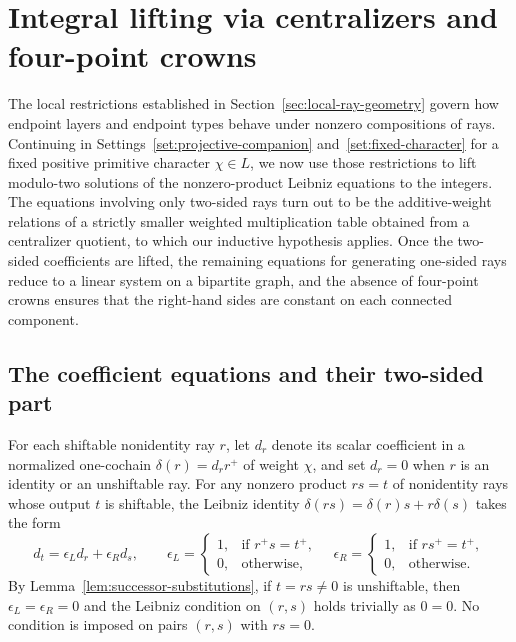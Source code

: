 \section{Integral lifting via centralizers and four-point crowns}
\label{sec:integral-partial-lifts}

The local restrictions established in Section~\ref{sec:local-ray-geometry} govern how endpoint layers and endpoint types behave under nonzero compositions of rays. Continuing in Settings~\ref{set:projective-companion} and~\ref{set:fixed-character} for a fixed positive primitive character $\chi\in L$, we now use those restrictions to lift modulo-two solutions of the nonzero-product Leibniz equations to the integers. The equations involving only two-sided rays turn out to be the additive-weight relations of a strictly smaller weighted multiplication table obtained from a centralizer quotient, to which our inductive hypothesis applies. Once the two-sided coefficients are lifted, the remaining equations for generating one-sided rays reduce to a linear system on a bipartite graph, and the absence of four-point crowns ensures that the right-hand sides are constant on each connected component.

\subsection{The coefficient equations and their two-sided part}

For each shiftable nonidentity ray $r$, let $d_r$ denote its scalar coefficient in a normalized one-cochain $\delta(r)=d_r r^+$ of weight $\chi$, and set $d_r=0$ when $r$ is an identity or an unshiftable ray. For any nonzero product $rs=t$ of nonidentity rays whose output $t$ is shiftable, the Leibniz identity $\delta(rs)=\delta(r)s+r\delta(s)$ takes the form
\begin{equation}
  d_t=\epsilon_L d_r+\epsilon_R d_s,
  \qquad
  \epsilon_L=\begin{cases}1, & \text{if }r^+s=t^+,\\ 0, & \text{otherwise},\end{cases}
  \quad
  \epsilon_R=\begin{cases}1, & \text{if }rs^+=t^+,\\ 0, & \text{otherwise}.
  \end{cases}
  \label{eq:partial-leibniz-group}
\end{equation}
By Lemma~\ref{lem:successor-substitutions}, if $t=rs\ne0$ is unshiftable, then $\epsilon_L=\epsilon_R=0$ and the Leibniz condition on $(r,s)$ holds trivially as $0=0$. No condition is imposed on pairs $(r,s)$ with $rs=0$.

